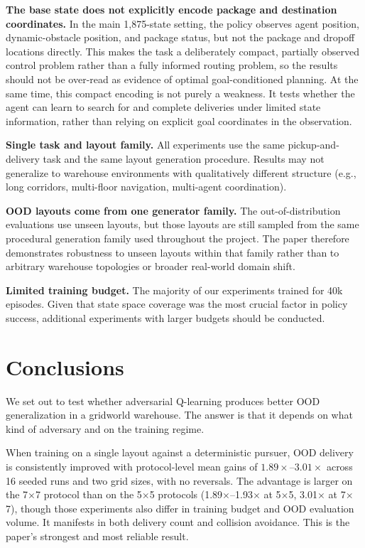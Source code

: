 \documentclass[sigconf]{aamas}
\begin{document}
\textbf{The base state does not explicitly encode package and destination coordinates.}
In the main 1,875-state setting, the policy observes agent position, dynamic-obstacle
position, and package status, but not the package and dropoff locations directly.
This makes the task a deliberately compact, partially observed control problem rather
than a fully informed routing problem, so the results should not be over-read as
evidence of optimal goal-conditioned planning. At the same time, this compact
encoding is not purely a weakness. It tests whether the agent can learn to search
for and complete deliveries under limited state information, rather than relying
on explicit goal coordinates in the observation.

\textbf{Single task and layout family.} All experiments use the same pickup-and-delivery
task and the same layout generation procedure. Results may not generalize to
warehouse environments with qualitatively different structure (e.g., long corridors,
multi-floor navigation, multi-agent coordination).

\textbf{OOD layouts come from one generator family.} The out-of-distribution
evaluations use unseen layouts, but those layouts are still sampled from the
same procedural generation family used throughout the project. The paper
therefore demonstrates robustness to unseen layouts within that family rather
than to arbitrary warehouse topologies or broader real-world domain shift.

\textbf{Limited training budget.} The majority of our experiments trained for 40k episodes. Given that state space coverage was the most crucial factor in policy success, additional experiments with larger budgets should be conducted.

\balance
\section{Conclusions}

We set out to test whether adversarial Q-learning produces better OOD
generalization in a gridworld warehouse. The answer is that it depends on what
kind of adversary and on the training regime.

When training on a single layout against a deterministic pursuer, OOD delivery is consistently improved
with protocol-level mean gains of $1.89\times$--$3.01\times$ across 16 seeded runs and two grid sizes, with no reversals.
The advantage is larger on the 7$\times$7 protocol than on the 5$\times$5
protocols (1.89$\times$--1.93$\times$ at 5$\times$5, 3.01$\times$ at 7$\times$7),
though those experiments also differ in training budget and OOD evaluation volume.
It manifests in both delivery count and collision avoidance. This is
the paper's strongest and most reliable result.
\end{document}
